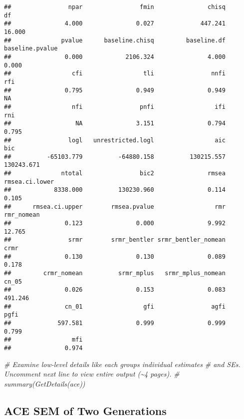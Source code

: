 \documentclass[smallextended]{svjour3}       %
\newenvironment{Shaded}{\begin{snugshade}}{\end{snugshade}}
\newcommand{\CommentTok}[1]{\textcolor[rgb]{0.56,0.35,0.01}{\textit{#1}}}
\begin{document}
\begin{verbatim}
##                npar                fmin               chisq                  df 
##               4.000               0.027             447.241              16.000 
##              pvalue      baseline.chisq         baseline.df     baseline.pvalue 
##               0.000            2106.324               4.000               0.000 
##                 cfi                 tli                nnfi                 rfi 
##               0.795               0.949               0.949                  NA 
##                 nfi                pnfi                 ifi                 rni 
##                  NA               3.151               0.794               0.795 
##                logl   unrestricted.logl                 aic                 bic 
##          -65103.779          -64880.158          130215.557          130243.671 
##              ntotal                bic2               rmsea      rmsea.ci.lower 
##            8338.000          130230.960               0.114               0.105 
##      rmsea.ci.upper        rmsea.pvalue                 rmr          rmr_nomean 
##               0.123               0.000               9.992              12.765 
##                srmr        srmr_bentler srmr_bentler_nomean                crmr 
##               0.130               0.130               0.089               0.178 
##         crmr_nomean          srmr_mplus   srmr_mplus_nomean               cn_05 
##               0.026               0.153               0.083             491.246 
##               cn_01                 gfi                agfi                pgfi 
##             597.581               0.999               0.999               0.799 
##                 mfi 
##               0.974
\end{verbatim}

\begin{Shaded}
\begin{Highlighting}[]
\CommentTok{\# Examine low{-}level details like each group\textquotesingle{}s individual estimates}
\CommentTok{\#  and SEs.  Uncomment next line to view entire output (\textasciitilde{}4 pages).}
\CommentTok{\# summary(GetDetails(ace))}
\end{Highlighting}
\end{Shaded}

\hypertarget{ace-sem-of-two-generations}{%
\subsection{ACE SEM of Two
Generations}\label{ace-sem-of-two-generations}}
\end{document}
